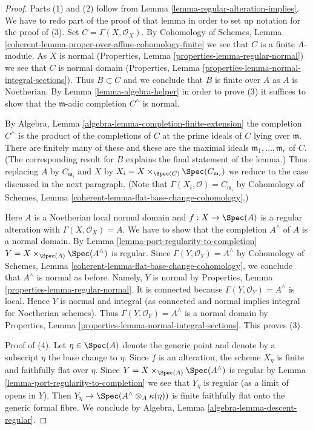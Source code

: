 \begin{proof}
Parts (1) and (2) follow from Lemma \ref{lemma-regular-alteration-implies}.
We have to redo part of the proof of that lemma in order to set up notation
for the proof of (3). Set $C = \Gamma(X, \mathcal{O}_X)$. By
Cohomology of Schemes, Lemma
\ref{coherent-lemma-proper-over-affine-cohomology-finite}
we see that $C$ is a finite $A$-module. As $X$ is normal
(Properties, Lemma \ref{properties-lemma-regular-normal})
we see that $C$ is normal domain
(Properties, Lemma \ref{properties-lemma-normal-integral-sections}).
Thus $B \subset C$ and we conclude that $B$ is finite over $A$
as $A$ is Noetherian. By Lemma \ref{lemma-algebra-helper}
in order to prove (3) it suffices to show
that the $\mathfrak m$-adic completion $C^\wedge$ is normal.

\medskip\noindent
By Algebra, Lemma \ref{algebra-lemma-completion-finite-extension}
the completion $C^\wedge$ is the product of the completions of
$C$ at the prime ideals of $C$ lying over $\mathfrak m$.
There are finitely many of these and these are the maximal
ideals $\mathfrak m_1, \ldots, \mathfrak m_r$ of $C$.
(The corresponding result for $B$ explains the final statement of the lemma.)
Thus replacing $A$ by $C_{\mathfrak m_i}$ and $X$ by
$X_i = X \times_{\Spec(C)} \Spec(C_{\mathfrak m_i})$
we reduce to the case discussed in the next paragraph.
(Note that $\Gamma(X_i, \mathcal{O}) = C_{\mathfrak m_i}$ by
Cohomology of Schemes, Lemma \ref{coherent-lemma-flat-base-change-cohomology}.)

\medskip\noindent
Here $A$ is a Noetherian local normal domain and $f : X \to \Spec(A)$ is a
regular alteration with $\Gamma(X, \mathcal{O}_X) = A$.
We have to show that the completion $A^\wedge$
of $A$ is a normal domain. By
Lemma \ref{lemma-port-regularity-to-completion}
$Y = X \times_{\Spec(A)} \Spec(A^\wedge)$ is regular.
Since $\Gamma(Y, \mathcal{O}_Y) = A^\wedge$ by
Cohomology of Schemes, Lemma \ref{coherent-lemma-flat-base-change-cohomology},
we conclude that $A^\wedge$ is normal as before.
Namely, $Y$ is normal by
Properties, Lemma \ref{properties-lemma-regular-normal}.
It is connected because $\Gamma(Y, \mathcal{O}_Y) = A^\wedge$ is local.
Hence $Y$ is normal and integral (as connected and normal
implies integral for Noetherian schemes). Thus
$\Gamma(Y, \mathcal{O}_Y) = A^\wedge$
is a normal domain by
Properties, Lemma \ref{properties-lemma-normal-integral-sections}.
This proves (3).

\medskip\noindent
Proof of (4). Let $\eta \in \Spec(A)$ denote the generic point
and denote by a subscript $\eta$ the base change to $\eta$.
Since $f$ is an alteration, the scheme $X_\eta$ is finite and
faithfully flat over $\eta$. Since $Y = X \times_{\Spec(A)} \Spec(A^\wedge)$
is regular by Lemma \ref{lemma-port-regularity-to-completion}
we see that $Y_\eta$ is regular (as a limit of opens in $Y$).
Then $Y_\eta \to \Spec(A^\wedge \otimes_A \kappa(\eta))$ is finite
faithfully flat onto the generic formal fibre. We conclude by
Algebra, Lemma \ref{algebra-lemma-descent-regular}.
\end{proof}
